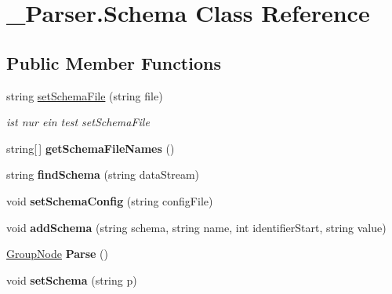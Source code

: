 \hypertarget{class__1920_parser_1_1_schema}{}\section{\+\_\+Parser.\+Schema Class Reference}
\label{class__1920_parser_1_1_schema}
\subsection*{Public Member Functions}
\begin{DoxyCompactItemize}
\item 
string \hyperlink{class__1920_parser_1_1_schema_abd7eba55dee6bec1ccfaa6e046ff401a}{set\+Schema\+File} (string file)
\begin{DoxyCompactList}\small\item\em ist nur ein test set\+Schema\+File \end{DoxyCompactList}\item 
string\mbox{[}$\,$\mbox{]} {\bfseries get\+Schema\+File\+Names} ()\hypertarget{class__1920_parser_1_1_schema_a4b93342ab889af0b36734ecea7a5d219}{}\label{class__1920_parser_1_1_schema_a4b93342ab889af0b36734ecea7a5d219}

\item 
string {\bfseries find\+Schema} (string data\+Stream)\hypertarget{class__1920_parser_1_1_schema_a2b3076000e2adeeba61d600748b9ca1f}{}\label{class__1920_parser_1_1_schema_a2b3076000e2adeeba61d600748b9ca1f}

\item 
void {\bfseries set\+Schema\+Config} (string config\+File)\hypertarget{class__1920_parser_1_1_schema_a75aff2be2a6f5a2655f0b7fb29513061}{}\label{class__1920_parser_1_1_schema_a75aff2be2a6f5a2655f0b7fb29513061}

\item 
void {\bfseries add\+Schema} (string schema, string name, int identifier\+Start, string value)\hypertarget{class__1920_parser_1_1_schema_a433f90bb7ab952649ee56ceb84405c95}{}\label{class__1920_parser_1_1_schema_a433f90bb7ab952649ee56ceb84405c95}

\item 
\hyperlink{class__1920_parser_1_1_group_node}{Group\+Node} {\bfseries Parse} ()\hypertarget{class__1920_parser_1_1_schema_a970c7c326e6f505c5798392da0fa0385}{}\label{class__1920_parser_1_1_schema_a970c7c326e6f505c5798392da0fa0385}

\item 
void {\bfseries set\+Schema} (string p)\hypertarget{class__1920_parser_1_1_schema_a82297f55ef46f1aa5a98d654b21fafec}{}\label{class__1920_parser_1_1_schema_a82297f55ef46f1aa5a98d654b21fafec}

\end{DoxyCompactItemize}


